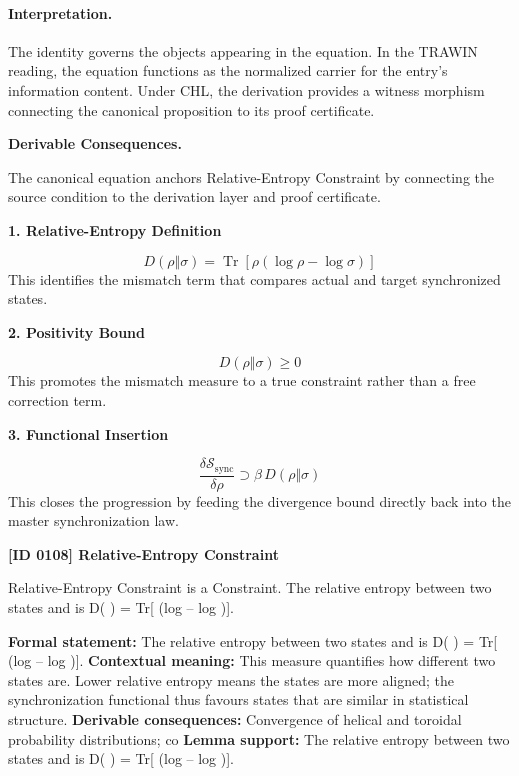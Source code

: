 \paragraph{Interpretation.}
The identity governs the objects appearing in the equation. In the TRAWIN reading, the equation functions as the normalized carrier for the entry’s information content. Under CHL, the derivation provides a witness morphism connecting the canonical proposition to its proof certificate.

\par\vspace{0.35em}
\noindent\textbf{Derivable Consequences.}\quad
\begingroup
\footnotesize
\raggedright
The canonical equation anchors Relative-Entropy Constraint by connecting the source condition to the derivation layer and proof certificate.
\par\endgroup

\noindent\textbf{1. Relative-Entropy Definition}\par
\[
D(\rho\Vert\sigma)= \operatorname{Tr}\!\left[\rho(\log\rho-\log\sigma)\right]
\]
\noindent This identifies the mismatch term that compares actual and target synchronized states.\par
\noindent\textbf{2. Positivity Bound}\par
\[
D(\rho\Vert\sigma)\ge 0
\]
\noindent This promotes the mismatch measure to a true constraint rather than a free correction term.\par
\noindent\textbf{3. Functional Insertion}\par
\[
\frac{\delta \mathcal{S}_{\mathrm{sync}}}{\delta \rho} \supset \beta\, D(\rho\Vert\sigma)
\]
\noindent This closes the progression by feeding the divergence bound directly back into the master synchronization law.\par

\clearpage
\noindent\textbf{[ID 0108] Relative-Entropy Constraint}\par
\vspace{0.35em}
\begingroup\small
{}
Relative-Entropy Constraint is a Constraint. The relative entropy between two states   and   is D(   ) = Tr[  (log   -- log  )].

\begingroup\footnotesize\setlength{\emergencystretch}{3em}\sloppy
\textbf{Formal statement:} The relative entropy between two states   and   is D(   ) = Tr[  (log   -- log  )].
\textbf{Contextual meaning:} This measure quantifies how different two states are. Lower relative entropy means the states are more aligned; the synchronization functional thus favours states that are similar in statistical structure.
\textbf{Derivable consequences:} Convergence of helical and toroidal probability distributions; co
\textbf{Lemma support:} The relative entropy between two states   and   is D(   ) = Tr[  (log   -- log  )].\par
\endgroup

